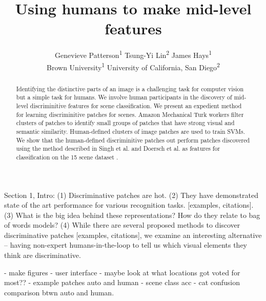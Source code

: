 \documentclass[10pt,twocolumn,letterpaper]{article}
\begin{document}
\title{Using humans to make mid-level features}

\author{Genevieve Patterson\textsuperscript{1} \quad Tsung-Yi Lin\textsuperscript{2} \quad James Hays\textsuperscript{1}\\
 Brown University\textsuperscript{1} \quad University of California, San Diego\textsuperscript{2}}

\maketitle

\begin{abstract}
  Identifying the distinctive parts of an image is a challenging task for computer vision but a simple task for humans. We involve human participants in the discovery of mid-level discriminitive features for scene classification. We present an expedient method for learning discriminitive patches for scenes. Amazon Mechanical Turk workers filter clusters of patches to identify small groups of patches that have strong visual and semantic similarity. Human-defined clusters of image patches are used to train SVMs. We show that the human-defined discriminitive patches out perform patches discovered using the method described in Singh et al. and Doersch et al. \cite{singh2012unsupervised, doersch2012makes} as features for classification on the 15 scene dataset \cite{lazebnik2006beyond}.

\end{abstract}

Section 1, Intro:
(1) Discriminative patches are hot. \cite{singh2012unsupervised, doersch2012makes, juneja13blocks}
(2) They have demonstrated state of the art performance for various recognition tasks. [examples, citations].
(3) What is the big idea behind these representations? How do they relate to bag of words models?
(4) While there are several proposed methods to discover discriminative patches [examples, citations], we examine an interesting alternative -- having non-expert humans-in-the-loop to tell us which visual elements they think are discriminative. 

 
 - make figures
 - user interface - maybe look at what locations got voted for most??
 - example patches auto and human
 - scene class acc
 - cat confusion comparison btwn auto and human. 
\end{document}
